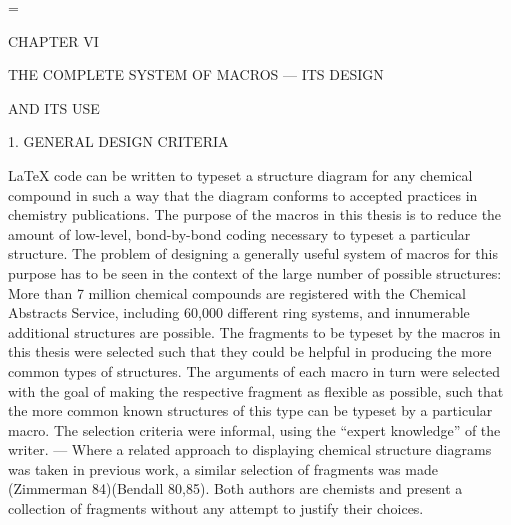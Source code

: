 
  \nofiles                          
  \def\LATEX{\LaTeX}
  \let\TEX = \TeX               
  \setcounter{totalnumber}{5}   
  \setcounter{topnumber}{3}     
  \setcounter{bottomnumber}{3}
  \setlength{\oddsidemargin}{3.9cm}     %
  \setlength{\textwidth}{5.7in}         %
  \setlength{\topmargin}{1cm}
  \setlength{\headheight}{.6cm}
  \setlength{\textheight}{8.5in}
  \setlength{\parindent}{1cm}
  \renewcommand{\baselinestretch}{1.5}
  \raggedbottom
  \setlength{\itemsep}{-2mm}
  
  
  
  
  
      
  \setcounter{page}{47}
  \setcounter{chapter}{6}
  =\tenrm
  \initial
 \newcommand{\ri}{No action is taken for any other value of
 the argument}
 
 \centerline{CHAPTER VI}
 \vspace{\len mm}
 \centerline{THE COMPLETE SYSTEM OF MACROS --- ITS DESIGN}
 \centerline{AND ITS USE}
 \vspace{\len mm}
 \centerline{1. GENERAL DESIGN CRITERIA}
 \vspace{\len mm}
 LaTeX code can be written to typeset a structure diagram for any
 chemical compound in such a way that the diagram conforms to
 accepted practices in chemistry publications.  The purpose
 of the macros in this thesis is to reduce the amount of 
 low-level, bond-by-bond coding necessary to typeset a particular
 structure.  The problem of designing a generally useful system
 of macros for this purpose has to be seen in the context
 of the large number of possible structures: More than 7 million
 chemical compounds are registered with the Chemical Abstracts
 Service, including 60,000 different ring systems, and
 innumerable additional structures are possible.
 The fragments to be typeset by the macros in this thesis were
 selected such that they could be helpful in producing the
 more common types of structures.  The arguments of each macro
 in turn were selected with the goal of making the respective
 fragment as flexible as possible, such that the more common
 known structures of this type can be typeset by a particular
 macro.  The selection criteria were informal, using the
 ``expert knowledge'' of the writer. --- Where a related 
 approach to displaying chemical structure diagrams was taken
 in previous work, a similar selection of fragments was made
 (Zimmerman 84)(Bendall 80,85). Both authors are chemists and
 present a collection of fragments without any attempt to
 justify their choices.
 
